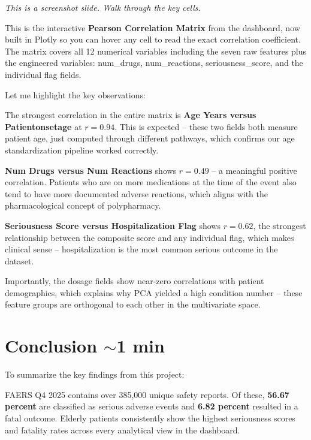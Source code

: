 \documentclass[12pt, letterpaper]{article}
\begin{document}
\begin{notebox}
\textit{This is a screenshot slide. Walk through the key cells.}
\end{notebox}

This is the interactive \textbf{Pearson Correlation Matrix} from the dashboard,
now built in Plotly so you can hover any cell to read the exact correlation
coefficient. The matrix covers all 12 numerical variables including the seven
raw features plus the engineered variables: num\_drugs, num\_reactions,
seriousness\_score, and the individual flag fields.

Let me highlight the key observations:

The strongest correlation in the entire matrix is \textbf{Age Years versus
Patientonsetage} at $r = 0.94$. This is expected -- these two fields both
measure patient age, just computed through different pathways, which confirms our
age standardization pipeline worked correctly.

\textbf{Num Drugs versus Num Reactions} shows $r = 0.49$ -- a meaningful
positive correlation. Patients who are on more medications at the time of the
event also tend to have more documented adverse reactions, which aligns with
the pharmacological concept of polypharmacy.

\textbf{Seriousness Score versus Hospitalization Flag} shows $r = 0.62$, the
strongest relationship between the composite score and any individual flag,
which makes clinical sense -- hospitalization is the most common serious outcome
in the dataset.

Importantly, the dosage fields show near-zero correlations with patient
demographics, which explains why PCA yielded a high condition number -- these
feature groups are orthogonal to each other in the multivariate space.

\section{Conclusion \hfill \textcolor{slidenumber}{\small $\sim$1 min}}

To summarize the key findings from this project:

FAERS Q4 2025 contains over 385,000 unique safety reports. Of these,
\textbf{56.67 percent} are classified as serious adverse events and
\textbf{6.82 percent} resulted in a fatal outcome. Elderly patients consistently
show the highest seriousness scores and fatality rates across every analytical
view in the dashboard.
\end{document}
